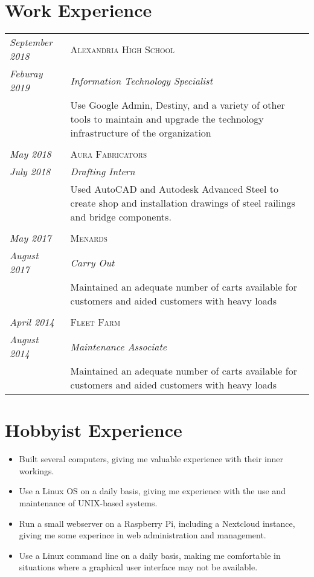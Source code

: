 \documentclass[letterpaper,10pt]{article}
\begin{document}
\section*{Work Experience}
	\begin{tabular}{R{3cm}|p{14cm}}
	\textsl{September 2018}	& \textsc{Alexandria High School}\\
	\textsl{Feburay 2019}	& \emph{Information Technology Specialist}\\
	&\footnotesize{Use Google Admin, Destiny, and a variety of other tools to maintain and upgrade the technology infrastructure of the organization}\\
	\\
	\textsl{May 2018}   & \textsc{Aura Fabricators}\\
	\textsl{July 2018}  & \emph{Drafting Intern}\\
	&\footnotesize{Used AutoCAD and Autodesk Advanced Steel to create shop and installation drawings of steel railings and bridge components.}\\
	\\
	\textsl{May 2017}	  & \textsc{Menards}\\
	\textsl{August 2017}  & \emph{Carry Out}\\
	&\footnotesize{Maintained an adequate number of carts available for customers and aided customers with heavy loads}\\
	\\
	\textsl{April 2014}   & \textsc{Fleet Farm}\\
	\textsl{August 2014}  & \emph{Maintenance Associate}\\
	&\footnotesize{Maintained an adequate number of carts available for customers and aided customers with heavy loads}\\
	\end{tabular}
\section*{Hobbyist Experience}
	\begin{itemize}
	\item Built several computers, giving me valuable experience with their inner workings.
	\item Use a Linux OS on a daily basis, giving me experience with the use and maintenance of UNIX-based systems.
	\item Run a small webserver on a Raspberry Pi, including a Nextcloud instance, giving me some experince in web administration and management.
	\item Use a Linux command line on a daily basis, making me comfortable in situations where a graphical user interface may not be available.
	\end{itemize}
\end{document}
